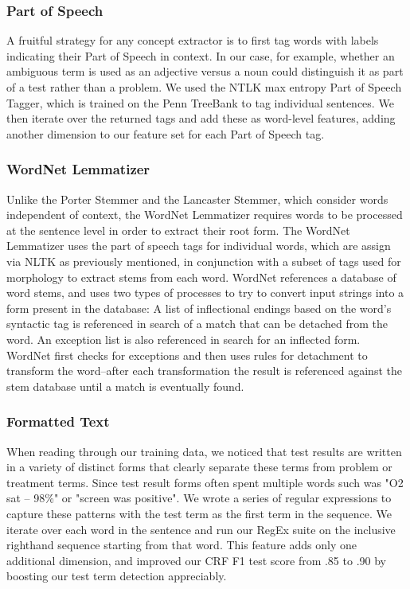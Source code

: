 \documentclass[preprint]{style}
\begin{document}
\subsubsection{Part of Speech}
A fruitful strategy for any concept extractor is to first tag words with labels indicating their Part of Speech in context. In our case, for example, whether an ambiguous term is used as an adjective versus a noun could distinguish it as part of a test rather than a problem. We used the NTLK max entropy Part of Speech Tagger, which is trained on the Penn TreeBank to tag individual sentences. We then iterate over the returned tags and add these as word-level features, adding another dimension to our feature set for each Part of Speech tag.

\subsubsection{WordNet Lemmatizer}
Unlike the Porter Stemmer and the Lancaster Stemmer, which consider words independent of context, the WordNet Lemmatizer requires words to be processed at the sentence level in order to extract their root form. The WordNet Lemmatizer uses the part of speech tags for individual words, which are assign via NLTK as previously mentioned, in conjunction with a subset of tags used for morphology to extract stems from each word. WordNet references a database of word stems, and uses two types of processes to try to convert input strings into a form present in the database: A list of inflectional endings based on the word's syntactic tag is referenced in search of a match that can be detached from the word. An exception list is also referenced in search for an inflected form. WordNet first checks for exceptions and then uses rules for detachment to transform the word--after each transformation the result is referenced against the stem database until a match is eventually found.

\subsubsection{Formatted Text}
When reading through our training data, we noticed that test results are written in a variety of distinct forms that clearly separate these terms from problem or treatment terms. Since test result forms often spent multiple words such was "O2 sat -- 98\%" or "screen was positive". We wrote a series of regular expressions to capture these patterns with the test term as the first term in the sequence. We iterate over each word in the sentence and run our RegEx suite on the inclusive righthand sequence starting from that word. This feature adds only one additional dimension, and improved our CRF F1 test score from .85 to .90 by boosting our test term detection appreciably.
\end{document}
